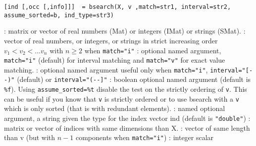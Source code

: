 

\begin{mandesc}
\end{mandesc}

\begin{calling_sequence}
\begin{verbatim}
[ind [,occ [,info]]]  = bsearch(X, v ,match=str1, interval=str2, assume_sorted=b, ind_type=str3)
\end{verbatim}
\end{calling_sequence}
\begin{parameters}
  \begin{varlist}
    :  matrix or vector of real numbers (Mat) or integers (IMat) or strings (SMat).
    : vector of real numbers, or integers, or strings in strict
    increasing order  $v_1 <  v_2 < ... v_n$ with $n \ge 2$ 
    when  \verb+match="i"+
    : optional named argument, \verb+match="i"+
                         (default) for interval matching and
                         \verb+match="v"+ for exact value matching.
    : optional named argument useful only
                           when  \verb+match="i"+, \verb+interval="[--)"+
                         (default) or  \verb+interval="(--]"+
    : boolean optional named argument (default
                              is \verb+%f+). Using \verb+assume_sorted=%t+ disable the test
                              on the strictly ordering of
                              \verb+v+. This can be useful if you know
                              that \verb+v+ is strictly ordered or to
                              use bsearch with a \verb+v+ which is
                              only sorted (that is with redundant elements).  
    : named optional argument, a string given the type for the index vector ind 
                             (default is \verb+"double"+)
    : matrix or vector of indices with same dimensions than X.
    : vector of same length than v (but with $n-1$ components 
                  when  \verb+match="i"+)
    : integer scalar
  \end{varlist}
\end{parameters}

